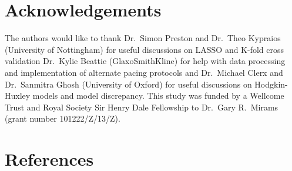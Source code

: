 \documentclass[11pt,a4paper,oneside]{article}
\begin{document}
\section{Acknowledgements}
The authors would like to thank Dr.~Simon Preston and Dr.~Theo Kypraios (University of Nottingham) for useful discussions on LASSO and K-fold cross validation\; Dr.~Kylie Beattie (GlaxoSmithKline) for help with data processing and implementation of alternate pacing protocols\; and Dr.~Michael Clerx and Dr.~Sanmitra Ghosh (University of Oxford) for useful discussions on Hodgkin-Huxley models and model discrepancy. This study was funded by a Wellcome Trust and Royal Society Sir Henry Dale Fellowship to Dr.~Gary R.~Mirams (grant number 101222/Z/13/Z).

\section{References}


\end{document}
